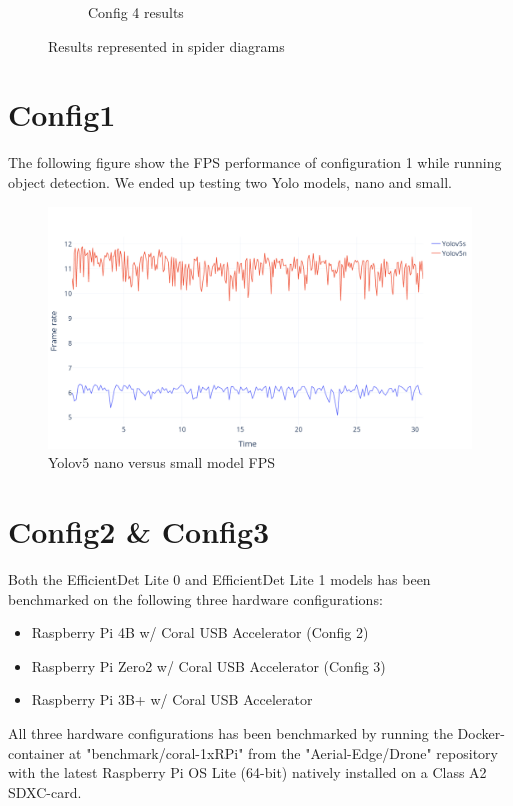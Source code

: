 \begin{figure}[h]
\begin{subfigure}{0.45\textwidth}
        \caption{Config 4 results}
        \label{fig:d}
    \end{subfigure}
    \caption{Results represented in spider diagrams}
    \label{fig:fourgrid}
\end{figure}

\newpage

\section{Config1}

The following figure show the FPS performance of configuration 1 while running object detection.
We ended up testing two Yolo models, nano and small. 
\begin{figure}[H]
    \centering
    \includegraphics[width=\textwidth]{evenbilder/Framerate yolo.png}
    \caption{Yolov5 nano versus small model FPS}
    \label{fig:yolofps}
\end{figure}


\section{Config2 \& Config3}

Both the EfficientDet Lite 0 and EfficientDet Lite 1 models has been benchmarked on the following three hardware configurations:
\begin{itemize}
    \item Raspberry Pi 4B       w/ Coral USB Accelerator (Config 2)
    \item Raspberry Pi Zero2    w/ Coral USB Accelerator (Config 3)
    \item Raspberry Pi 3B+      w/ Coral USB Accelerator
\end{itemize}

All three hardware configurations has been benchmarked by running the Docker-container at "benchmark/coral-1xRPi" from the "Aerial-Edge/Drone" repository \cite{github-Aerial-Edge_Drone} with the latest Raspberry Pi OS Lite (64-bit) natively installed on a Class A2 SDXC-card.

